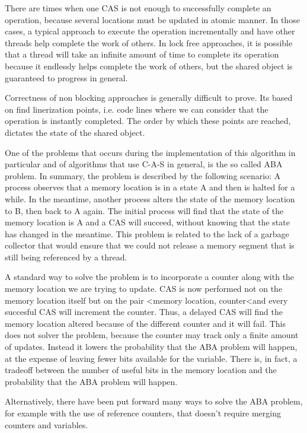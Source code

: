 There are times when one CAS is not enough to successfully complete an operation, because several locations must be updated in atomic manner. In those cases, a typical approach to execute the operation  incrementally and have other threads help complete the work of others. In lock free approaches, it is possible that a thread will take an infinite amount of time to complete its operation because it endlessly helps complete the work of others, but the shared object is guaranteed to progress in general.

Correctness of non blocking approaches is  generally difficult to prove. Its based on find linerization points, i.e. code lines where we can consider that the operation is instantly completed. The order by which these points are reached, dictates the state of the shared object.


One of the problems that occurs during the implementation of this algorithm in particular and of algorithms that use C-A-S in general, is the so called ABA problem. In summary, the problem is described by the following scenario: A process observes that a memory location is in a state A and then is halted for a while. In the meantime, another process alters the state of the memory location to B, then back to A again. The initial process will find that the state of the memory location is A and a CAS will succeed, without knowing that the state has changed in the meantime. This problem is related to the lack of a garbage collector that would ensure that we could not release a memory segment that is still being referenced by a thread.

A standard way to solve the problem is to incorporate a counter along with the memory location we are trying to update. CAS is now performed not on the memory location itself but on the pair \textless memory location, counter\textless and every succesful CAS will increment the counter. Thus, a delayed CAS will find the memory location altered because of the different counter and it will fail. This does not solver the problem, because the counter may track only a finite amount of updates. Instead it lowers the probability that the ABA problem will happen, at the expense of leaving fewer bits available for the variable. There is, in fact, a tradeoff between the number of useful bits in the memory location and the probability that the ABA problem will happen.


Alternatively,  there have been put forward many ways to solve the ABA problem, for example with the use of reference counters, that doesn't require merging counters and variables.


